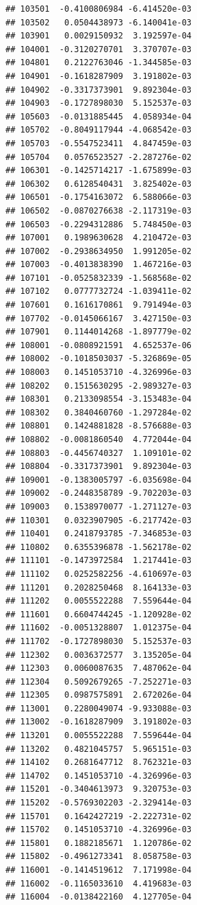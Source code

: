 \documentclass[ignorenonframetext,]{beamer}
\begin{document}
\begin{frame}[fragile]
\begin{verbatim}
## 103501  -0.4100806984 -6.414520e-03
## 103502   0.0504438973 -6.140041e-03
## 103901   0.0029150932  3.192597e-04
## 104001  -0.3120270701  3.370707e-03
## 104801   0.2122763046 -1.344585e-03
## 104901  -0.1618287909  3.191802e-03
## 104902  -0.3317373901  9.892304e-03
## 104903  -0.1727898030  5.152537e-03
## 105603  -0.0131885445  4.058934e-04
## 105702  -0.8049117944 -4.068542e-03
## 105703  -0.5547523411  4.847459e-03
## 105704   0.0576523527 -2.287276e-02
## 106301  -0.1425714217 -1.675899e-03
## 106302   0.6128540431  3.825402e-03
## 106501  -0.1754163072  6.588066e-03
## 106502  -0.0870276638 -2.117319e-03
## 106503  -0.2294312886  5.748450e-03
## 107001   0.1989630628  4.210472e-03
## 107002  -0.2938634950  1.991205e-02
## 107003  -0.4013838390  1.467216e-03
## 107101  -0.0525832339 -1.568568e-02
## 107102   0.0777732724 -1.039411e-02
## 107601   0.1616170861  9.791494e-03
## 107702  -0.0145066167  3.427150e-03
## 107901   0.1144014268 -1.897779e-02
## 108001  -0.0808921591  4.652537e-06
## 108002  -0.1018503037 -5.326869e-05
## 108003   0.1451053710 -4.326996e-03
## 108202   0.1515630295 -2.989327e-03
## 108301   0.2133098554 -3.153483e-04
## 108302   0.3840460760 -1.297284e-02
## 108801   0.1424881828 -8.576688e-03
## 108802  -0.0081860540  4.772044e-04
## 108803  -0.4456740327  1.109101e-02
## 108804  -0.3317373901  9.892304e-03
## 109001  -0.1383005797 -6.035698e-04
## 109002  -0.2448358789 -9.702203e-03
## 109003   0.1538970077 -1.271127e-03
## 110301   0.0323907905 -6.217742e-03
## 110401   0.2418793785 -7.346853e-03
## 110802   0.6355396878 -1.562178e-02
## 111101  -0.1473972584  1.217441e-03
## 111102   0.0252582256 -4.610697e-03
## 111201   0.2028250468  8.164133e-03
## 111202   0.0055522288  7.559644e-04
## 111601   0.6604744245 -1.120928e-02
## 111602  -0.0051328807  1.012375e-04
## 111702  -0.1727898030  5.152537e-03
## 112302   0.0036372577  3.135205e-04
## 112303   0.0060087635  7.487062e-04
## 112304   0.5092679265 -7.252271e-03
## 112305   0.0987575891  2.672026e-04
## 113001   0.2280049074 -9.933088e-03
## 113002  -0.1618287909  3.191802e-03
## 113201   0.0055522288  7.559644e-04
## 113202   0.4821045757  5.965151e-03
## 114102   0.2681647712  8.762321e-03
## 114702   0.1451053710 -4.326996e-03
## 115201  -0.3404613973  9.320753e-03
## 115202  -0.5769302203 -2.329414e-03
## 115701   0.1642427219 -2.222731e-02
## 115702   0.1451053710 -4.326996e-03
## 115801   0.1882185671  1.120786e-02
## 115802  -0.4961273341  8.058758e-03
## 116001  -0.1414519612  7.171998e-04
## 116002  -0.1165033610  4.419683e-03
## 116004  -0.0138422160  4.127705e-04

\end{verbatim}
\end{frame}
\end{document}
